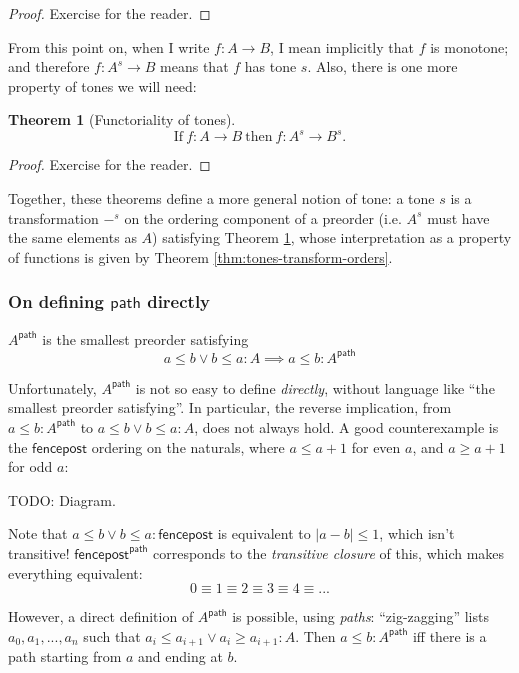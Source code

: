 \documentclass{article}
\newtheorem{theorem}{Theorem}
\newcommand{\todo}[1]{{\color{red}#1}}
\newcommand{\ms}[1]{\ensuremath{\mathsf{#1}}}
\renewcommand{\path}{\ms{path}}
\begin{document}
\begin{proof} Exercise for the reader. \end{proof}

From this point on, when I write $f : A \to B$, I mean implicitly that $f$ is
monotone; and therefore $f : A^s \to B$ means that $f$ has tone $s$.
%
Also, there is one more property of tones we will need:

\begin{theorem}[Functoriality of tones]\label{thm:tone-functoriality}
  \[\text{If}~ f : A \to B ~\text{then}~ f : A^s \to B^s\text{.}\]
\end{theorem}
\begin{proof}
  Exercise for the reader.
\end{proof}

Together, these theorems define a more general notion of tone: a tone $s$ is a
transformation $-^s$ on the ordering component of a preorder (i.e. $A^s$ must
have the same elements as $A$) satisfying Theorem \ref{thm:tone-functoriality},
whose interpretation as a property of functions is given by Theorem
\ref{thm:tones-transform-orders}.

\subsubsection{On defining \ms{path} directly} \label{sec:defining-path}

$A^\path$ is the smallest preorder satisfying
\[ a \le b \vee b \le a : A \implies a \le b : A^\path \]

Unfortunately, $A^\path$ is not so easy to define \emph{directly}, without
language like ``the smallest preorder satisfying''.
%
In particular, the reverse implication, from $a \le b : A^\path$ to $a \le b
\vee b \le a : A$, does not always hold. A good counterexample is the
\ms{fencepost} ordering on the naturals, where $a \le a+1$ for even $a$, and $a
\ge a+1$ for odd $a$:

\todo{TODO: Diagram}.

Note that $a \le b \vee b \le a : \ms{fencepost}$ is equivalent to $|a-b| \le
1$, which isn't transitive! $\ms{fencepost}^\path$ corresponds to the
\emph{transitive closure} of this, which makes everything equivalent:
\[ 0 \equiv 1 \equiv 2 \equiv 3 \equiv 4 \equiv ... \]

However, a direct definition of $A^\path$ is possible, using \emph{paths}:
``zig-zagging'' lists $a_0, a_1, ..., a_n$ such that $a_i \le a_{i+1} \vee a_i
\ge a_{i+1} : A$. Then $a \le b : A^\path$ iff there is a path starting from $a$
and ending at $b$.
\end{document}
